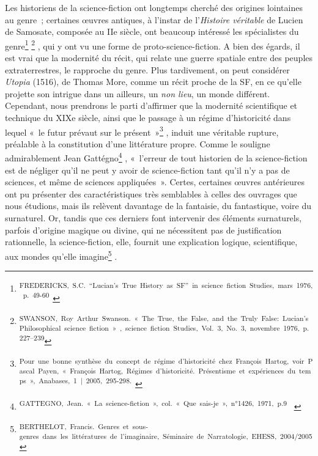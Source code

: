 \documentclass[letterpaper,portrait,12pt]{article}
\begin{document}
	Les historiens de la science-fiction ont longtemps cherch\'{e} des origines lointaines au genre ; certaines \oe{}uvres antiques, \`{a} l'instar de l'\emph{Histoire v\'{e}ritable }de Lucien de Samosate, compos\'{e}e au IIe si\`{e}cle, ont beaucoup int\'{e}ress\'{e} les sp\'{e}cialistes du genre\footnote{\textsuperscript{\newpage
}\textsuperscript{	FREDERICKS,\ S.C.\ {``}Lucian's\ True\ History\ as\ SF''\ in\ science\ fiction\ Studies,\ mars\ 1976,\ p.\ 49-60\ }} \footnote{\textsuperscript{\newpage
}\textsuperscript{	SWANSON,\ Roy\ Arthur\ Swanson.\ «\ The\ True,\ the\ False,\ and\ the\ Truly\ False:\ Lucian's\ Philosophical\ science\ fiction\ »\ ,\ science\ fiction\ Studies,\ Vol.\ 3,\ No.\ 3,\ novembre\ 1976,\ p.\ 227--239}} , qui y ont vu une forme de proto-science-fiction. A bien des \'{e}gards, il est vrai que la modernit\'{e} du r\'{e}cit, qui relate une guerre spatiale entre des peuples extraterrestres, le rapproche du genre. Plus tardivement, on peut consid\'{e}rer \emph{Utopia }(1516), de Thomas More, comme un r\'{e}cit proche de la SF, en ce qu'elle projette son intrigue dans un ailleurs, un \emph{non lieu}, un monde diff\'{e}rent. Cependant, nous prendrons le parti d'affirmer que la modernit\'{e} scientifique et technique du XIXe si\`{e}cle, ainsi que le passage \`{a} un r\'{e}gime d'historicit\'{e} dans lequel « le futur pr\'{e}vaut sur le pr\'{e}sent »\footnote{\textsuperscript{\newpage
}\textsuperscript{	Pour\ une\ bonne\ synth\`{e}se\ du\ concept\ de\ r\'{e}gime\ d'historicit\'{e}\ chez\ Fran\c{c}ois\ Hartog,\ voir\ Pascal\ Payen,\ «\ Fran\c{c}ois\ Hartog,\ R\'{e}gimes\ d'historicit\'{e}.\ Pr\'{e}sentisme\ et\ exp\'{e}riences\ du\ temps\ »,\ Anabases,\ 1\ |\ 2005,\ 295-298.\ }} , induit une v\'{e}ritable rupture, pr\'{e}alable \`{a} la constitution d'une litt\'{e}rature propre. Comme le souligne admirablement Jean Gatt\'{e}gno\footnote{\textsuperscript{\newpage
}\textsuperscript{	GATTEGNO,\ Jean.\ «\ La\ science-fiction\ »,\ col.\ «\ Que\ sais-je\ »,\ n°1426,\ 1971,\ p.9\ \ }} , « l'erreur de tout historien de la science-fiction est de n\'{e}gliger qu'il ne peut y avoir de science-fiction tant qu'il n'y a pas de sciences, et m\^{e}me de sciences appliqu\'{e}es ». Certes, certaines \oe{}uvres ant\'{e}rieures ont pu pr\'{e}senter des caract\'{e}ristiques tr\`{e}s semblables \`{a} celles des ouvrages que nous \'{e}tudions, mais ils rel\`{e}vent davantage de la fantaisie, du fantastique, voire du surnaturel. Or, tandis que ces derniers font intervenir des \'{e}l\'{e}ments surnaturels, parfois d'origine magique ou divine, qui ne n\'{e}cessitent pas de justification rationnelle, la science-fiction, elle, fournit une explication logique, scientifique, aux mondes qu'elle imagine\footnote{\textsuperscript{\newpage
}\textsuperscript{	BERTHELOT,\ Francis.\ Genres\ et\ sous-genres\ dans\ les\ litt\'{e}ratures\ de\ l'imaginaire,\ S\'{e}minaire\ de\ Narratologie,\ EHESS,\ 2004/2005}} .
\end{document}
